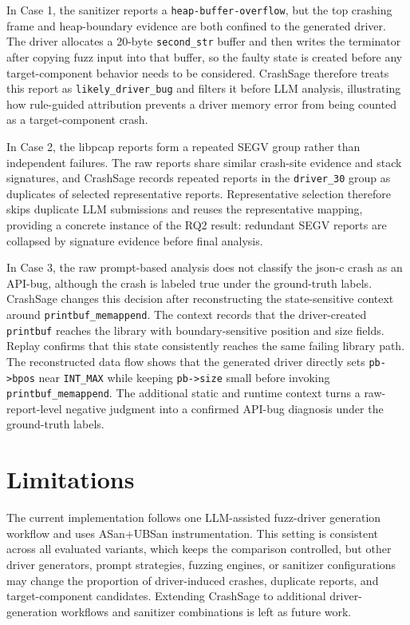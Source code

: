 \documentclass[pdflatex,sn-basic]{sn-jnl}%
\theoremstyle{thmstyleone}%
\theoremstyle{thmstyletwo}%
\theoremstyle{thmstylethree}%
\begin{document}
In Case 1, the sanitizer reports a \texttt{heap-buffer-overflow}, but the top crashing frame and heap-boundary evidence are both confined to the generated driver.
The driver allocates a 20-byte \texttt{second\_str} buffer and then writes the terminator after copying fuzz input into that buffer, so the faulty state is created before any target-component behavior needs to be considered.
CrashSage therefore treats this report as \texttt{likely\_driver\_bug} and filters it before LLM analysis, illustrating how rule-guided attribution prevents a driver memory error from being counted as a target-component crash.

In Case 2, the libpcap reports form a repeated SEGV group rather than independent failures.
The raw reports share similar crash-site evidence and stack signatures, and CrashSage records repeated reports in the \texttt{driver\_30} group as duplicates of selected representative reports.
Representative selection therefore skips duplicate LLM submissions and reuses the representative mapping, providing a concrete instance of the RQ2 result: redundant SEGV reports are collapsed by signature evidence before final analysis.

In Case 3, the raw prompt-based analysis does not classify the json-c crash as an API-bug, although the crash is labeled true under the ground-truth labels.
CrashSage changes this decision after reconstructing the state-sensitive context around \texttt{printbuf\_memappend}.
The context records that the driver-created \texttt{printbuf} reaches the library with boundary-sensitive position and size fields.
Replay confirms that this state consistently reaches the same failing library path.
The reconstructed data flow shows that the generated driver directly sets \texttt{pb->bpos} near \texttt{INT\_MAX} while keeping \texttt{pb->size} small before invoking \texttt{printbuf\_memappend}.
The additional static and runtime context turns a raw-report-level negative judgment into a confirmed API-bug diagnosis under the ground-truth labels.

\FloatBarrier

\section{Limitations}
\label{sec:limitations}

The current implementation follows one LLM-assisted fuzz-driver generation workflow and uses ASan+UBSan instrumentation. This setting is consistent across all evaluated variants, which keeps the comparison controlled, but other driver generators, prompt strategies, fuzzing engines, or sanitizer configurations may change the proportion of driver-induced crashes, duplicate reports, and target-component candidates. Extending CrashSage to additional driver-generation workflows and sanitizer combinations is left as future work.
\end{document}
